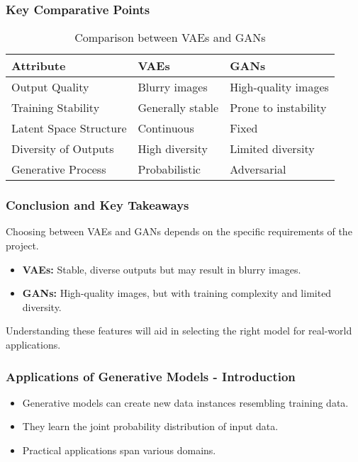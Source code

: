 \documentclass[aspectratio=169]{beamer}
\begin{document}
\begin{frame}[fragile]
    \frametitle{Key Comparative Points}
    \begin{table}[htbp]
        \centering
        \begin{tabular}{|l|l|l|}
            \hline
            \textbf{Attribute} & \textbf{VAEs} & \textbf{GANs} \\
            \hline
            Output Quality & Blurry images & High-quality images \\
            Training Stability & Generally stable & Prone to instability \\
            Latent Space Structure & Continuous & Fixed \\
            Diversity of Outputs & High diversity & Limited diversity \\
            Generative Process & Probabilistic & Adversarial \\
            \hline
        \end{tabular}
        \caption{Comparison between VAEs and GANs}
    \end{table}
\end{frame}

\begin{frame}[fragile]
    \frametitle{Conclusion and Key Takeaways}
    Choosing between VAEs and GANs depends on the specific requirements of the project. 
    \begin{itemize}
        \item \textbf{VAEs:} Stable, diverse outputs but may result in blurry images.
        \item \textbf{GANs:} High-quality images, but with training complexity and limited diversity.
    \end{itemize}
    Understanding these features will aid in selecting the right model for real-world applications.
\end{frame}

\begin{frame}[fragile]
    \frametitle{Applications of Generative Models - Introduction}
    \begin{itemize}
        \item Generative models can create new data instances resembling training data.
        \item They learn the joint probability distribution of input data.
        \item Practical applications span various domains.
    \end{itemize}
\end{frame}
\end{document}
